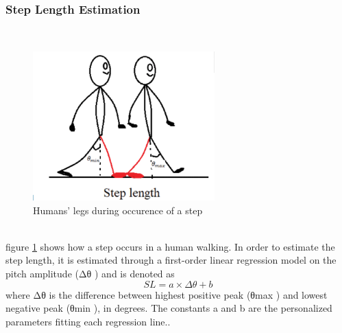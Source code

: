 \documentclass{l4proj}
\begin{document}
\subsubsection{Step Length Estimation}~\\
\begin{figure}[h]
    \centering
    \includegraphics[width=70mm]{images/steplength}
    \caption{Humans' legs during occurence of a step}
    \label{fig:step1}
\end{figure}\\
figure \ref{fig:step1} shows how a step occurs in a human walking. In order to estimate the step length, it is estimated through a first-order linear regression model on the pitch amplitude  (Δθ ) and is denoted as 
\begin{equation*} SL = a \times \Delta \theta + b\tag{18}\end{equation*}
where Δθ is the difference between highest positive peak (θmax ) and lowest negative peak (θmin ), in degrees. The constants a and b are the personalized parameters fitting each regression line.\cite{steplengthestimate}.
\end{document}
